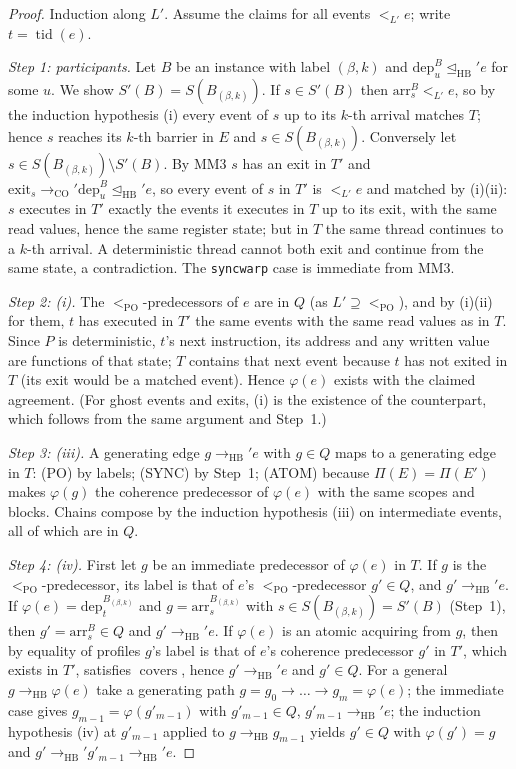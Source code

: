 \documentclass[11pt]{article}
\theoremstyle{remark}
\DeclareMathOperator{\tid}{tid}
\DeclareMathOperator{\covers}{covers}
\newcommand{\HB}{\to_{\mathrm{HB}}}
\newcommand{\HBr}{\trianglelefteq_{\mathrm{HB}}}
\newcommand{\CO}{\to_{\mathrm{CO}}}
\newcommand{\PO}{<_{\mathrm{PO}}}
\newcommand{\arr}[2]{\mathrm{arr}^{#2}_{#1}}
\newcommand{\dep}[2]{\mathrm{dep}^{#2}_{#1}}
\newcommand{\ext}[1]{\mathrm{exit}_{#1}}
\begin{document}
\begin{proof}
Induction along $L'$. Assume the claims for all events $<_{L'}e$; write $t=\tid(e)$.

\emph{Step 1: participants.} Let $B$ be an instance with label $(\beta,k)$ and
$\dep{u}{B}\HBr' e$ for some $u$. We show $S'(B)=S(B_{(\beta,k)})$.
If $s\in S'(B)$ then $\arr{s}{B}<_{L'}e$, so by the induction hypothesis (i)
every event of $s$ up to its $k$-th arrival matches $T$; hence $s$ reaches its
$k$-th barrier in $E$ and $s\in S(B_{(\beta,k)})$. Conversely let
$s\in S(B_{(\beta,k)})\setminus S'(B)$. By MM3 $s$ has an exit in $T'$ and
$\ext{s}\CO'\dep{u}{B}\HBr' e$, so every event of $s$ in $T'$ is
$<_{L'}e$ and matched by (i)(ii): $s$ executes in $T'$ exactly the events it
executes in $T$ up to its exit, with the same read values, hence the same
register state; but in $T$ the same thread continues to a $k$-th arrival. A
deterministic thread cannot both exit and continue from the same state, a
contradiction. The \texttt{syncwarp} case is immediate from MM3.

\emph{Step 2: (i).} The $\PO$-predecessors of $e$ are in $Q$ (as $L'\supseteq\PO$),
and by (i)(ii) for them, $t$ has executed in $T'$ the same events with the same
read values as in $T$. Since $P$ is deterministic, $t$'s next instruction, its
address and any written value are functions of that state; $T$ contains that
next event because $t$ has not exited in $T$ (its exit would be a matched
event). Hence $\varphi(e)$ exists with the claimed agreement. (For ghost events
and exits, (i) is the existence of the counterpart, which follows from the same
argument and Step~1.)

\emph{Step 3: (iii).} A generating edge $g\HB' e$ with $g\in Q$ maps to a
generating edge in $T$: (PO) by labels; (SYNC) by Step~1; (ATOM) because
$\Pi(E)=\Pi(E')$ makes $\varphi(g)$ the coherence predecessor of $\varphi(e)$
with the same scopes and blocks. Chains compose by the induction hypothesis
(iii) on intermediate events, all of which are in $Q$.

\emph{Step 4: (iv).} First let $g$ be an immediate predecessor of $\varphi(e)$
in $T$. If $g$ is the $\PO$-predecessor, its label is that of $e$'s
$\PO$-predecessor $g'\in Q$, and $g'\HB' e$. If $\varphi(e)=\dep{t}{B_{(\beta,k)}}$
and $g=\arr{s}{B_{(\beta,k)}}$ with $s\in S(B_{(\beta,k)})=S'(B)$ (Step~1), then
$g'=\arr{s}{B}\in Q$ and $g'\HB' e$. If $\varphi(e)$ is an atomic acquiring from
$g$, then by equality of profiles $g$'s label is that of $e$'s coherence
predecessor $g'$ in $T'$, which exists in $T'$, satisfies $\covers$, hence
$g'\HB' e$ and $g'\in Q$. For a general $g\HB\varphi(e)$ take a generating path
$g=g_0\to\dots\to g_m=\varphi(e)$; the immediate case gives $g_{m-1}=\varphi(g'_{m-1})$
with $g'_{m-1}\in Q$, $g'_{m-1}\HB' e$; the induction hypothesis (iv) at
$g'_{m-1}$ applied to $g\HB g_{m-1}$ yields $g'\in Q$ with $\varphi(g')=g$ and
$g'\HB' g'_{m-1}\HB' e$.


\end{proof}
\end{document}
